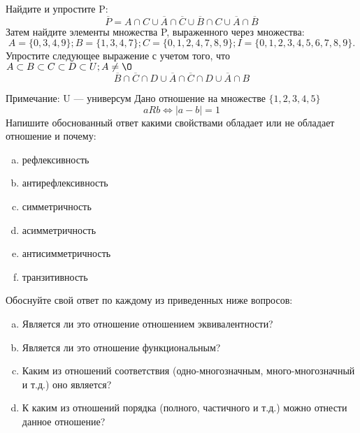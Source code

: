 \documentclass[10pt]{exam}
\begin{document}
\begin{questions}
\question
Найдите и упростите P:
\begin{equation*}
\overline{P} = A \cap C \cup \overline{A} \cap \overline{C} \cup \overline{B} \cap C \cup \overline{A} \cap \overline{B}
\end{equation*}
Затем найдите элементы множества P, выраженного через множества:
\begin{equation*}
A = \{0, 3, 4, 9\}; 
B = \{1, 3, 4, 7\};
C = \{0, 1, 2, 4, 7, 8, 9\};
I = \{0, 1, 2, 3, 4, 5, 6, 7, 8, 9\}.
\end{equation*}\question
Упростите следующее выражение с учетом того, что $A\subset B \subset C \subset D \subset U; A \neq \O$
\begin{equation*}
\overline{B} \cap \overline{C} \cap D \cup \overline{A} \cap \overline{C} \cap D \cup \overline{A} \cap B
\end{equation*}

Примечание: U — универсум\question
Дано отношение на множестве $\{1, 2, 3, 4, 5\}$ 
\begin{equation*}
aRb \iff |a-b| = 1
\end{equation*}
Напишите обоснованный ответ какими свойствами обладает или не обладает отношение и почему:   
\begin{enumerate} [a)]\setcounter{enumi}{0}
\item рефлексивность
\item антирефлексивность
\item симметричность
\item асимметричность
\item антисимметричность
\item транзитивность
\end{enumerate}

Обоснуйте свой ответ по каждому из приведенных ниже вопросов:
\begin{enumerate} [a)]\setcounter{enumi}{0}
    \item Является ли это отношение отношением эквивалентности?
    \item Является ли это отношение функциональным?
    \item Каким из отношений соответствия (одно-многозначным, много-многозначный и т.д.) оно является?
    \item К каким из отношений порядка (полного, частичного и т.д.) можно отнести данное отношение?
\end{enumerate}


\end{questions}
\end{document}
